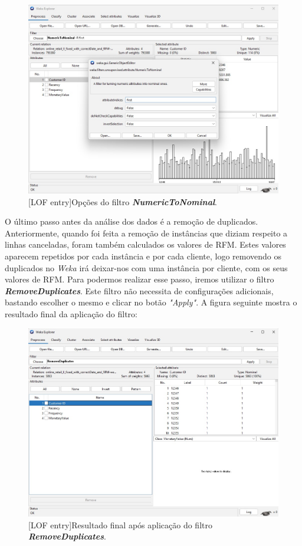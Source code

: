 \documentclass{easychair}
\begin{document}
\vspace{-0.2cm}
\begin{figure}[H]
    \begin{centering}
    \includegraphics[width=0.63\linewidth]{imagens/figure4.jpg}\label{cap-2-fig4}
    [LOF entry]{Opções do filtro \textbf{\textit{NumericToNominal}}.}
    \label{fig4}
    \end{centering}
\end{figure}


\vspace{-0.3cm}
O último passo antes da análise dos dados é a remoção de duplicados. Anteriormente, quando foi feita a remoção de instâncias que diziam respeito a linhas canceladas, foram também calculados os valores de RFM. Estes valores aparecem repetidos por cada instância e por cada cliente, logo removendo os duplicados no \textit{Weka} irá deixar-nos com uma instância por cliente, com os seus valores de RFM. Para podermos realizar esse passo, iremos utilizar o filtro \textbf{\textit{RemoveDuplicates}}. Este filtro não necessita de configurações adicionais, bastando escolher o mesmo e clicar no botão \textit{"Apply"}. A figura seguinte mostra o resultado final da aplicação do filtro:

 \begin{figure}[H]
    \begin{centering}
    \includegraphics[width=0.63\linewidth]{imagens/figure5.jpg}\label{cap-2-fig5}
    [LOF entry]{Resultado final após aplicação do filtro \textit{\textbf{RemoveDuplicates}}.}
    \label{fig5}
    \end{centering}
\end{figure}
\end{document}
